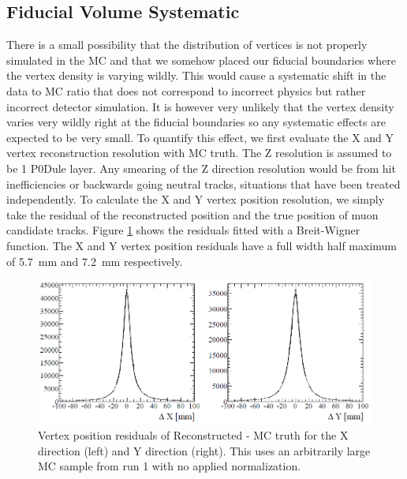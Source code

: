\subsection{Fiducial Volume Systematic}
\label{sec:fidvolsys}

There is a small possibility that the distribution of vertices is not properly simulated in the MC and that we somehow placed our fiducial boundaries where the vertex density is varying wildly. This would cause a systematic shift in the data to MC ratio that does not correspond to incorrect physics but rather incorrect detector simulation. It is however very unlikely that the vertex density varies very wildly right at the fiducial boundaries so any systematic effects are expected to be very small. To quantify this effect, we first evaluate the X and Y vertex reconstruction resolution with MC truth. The Z resolution is assumed to be 1 P0Dule layer. Any smearing of the Z direction resolution would be from hit inefficiencies or backwards going neutral tracks, situations that have been treated independently. To calculate the X and Y vertex position resolution, we simply take the residual of the reconstructed position and the true position of muon candidate tracks. Figure \ref{fig:fiducialResolution} shows the residuals fitted with a Breit-Wigner function. The X and Y vertex position residuals have a full width half maximum of 5.7~mm and 7.2~mm respectively.

\begin{figure}[ht]
\centering
\includegraphics[width=5.5in]{Figures/Systematics/FVresolution.png}
\caption{Vertex position residuals of Reconstructed - MC truth for the X direction (left) and Y direction (right). This uses an arbitrarily large MC sample from run 1 with no applied normalization.} 
\label{fig:fiducialResolution}
\end{figure}

